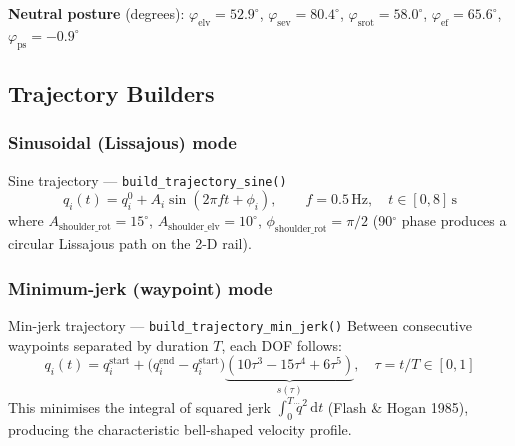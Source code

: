 \documentclass[11pt,a4paper]{article}
\begin{document}
\medskip
\textbf{Neutral posture} (degrees):
\hspace{1em}$\varphi_\text{elv} = 52.9^\circ$,\;
$\varphi_\text{sev} = 80.4^\circ$,\;
$\varphi_\text{srot} = 58.0^\circ$,\;
$\varphi_\text{ef} = 65.6^\circ$,\;
$\varphi_\text{ps} = -0.9^\circ$

\subsection{Trajectory Builders}

\subsubsection{Sinusoidal (Lissajous) mode}

\begin{eqbox}{Sine trajectory — \texttt{build\_trajectory\_sine()}}
\begin{equation}
q_i(t) = q_i^{0} + A_i \sin(2\pi f t + \phi_i),
\qquad f = 0.5\,\text{Hz},\quad t \in [0, 8]\,\text{s}
\end{equation}
where $A_{\text{shoulder\_rot}}=15^\circ$, $A_{\text{shoulder\_elv}}=10^\circ$,
$\phi_{\text{shoulder\_rot}}=\pi/2$
(90$^\circ$ phase produces a circular Lissajous path on the 2-D rail).
\end{eqbox}

\subsubsection{Minimum-jerk (waypoint) mode}

\begin{eqbox}{Min-jerk trajectory — \texttt{build\_trajectory\_min\_jerk()}}
Between consecutive waypoints separated by duration $T$, each DOF follows:
\begin{equation}
q_i(t) = q_i^{\text{start}}
  + \bigl(q_i^{\text{end}} - q_i^{\text{start}}\bigr)
    \underbrace{\!\left(10\tau^3 - 15\tau^4 + 6\tau^5\right)\!}_{s(\tau)},
\quad \tau = t/T \in [0,1]
\end{equation}
This minimises the integral of squared jerk $\int_0^T \dddot{q}^2\,\mathrm{d}t$
(Flash \& Hogan 1985), producing the characteristic bell-shaped velocity profile.
\end{eqbox}
\end{document}
